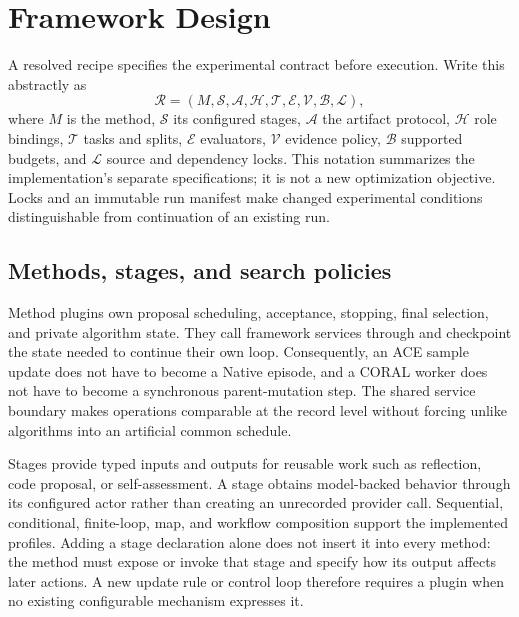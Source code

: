 \section{Framework Design}
\label{sec:framework}

A resolved recipe specifies the experimental contract before execution. Write this abstractly as
\begin{equation}
\mathcal{R}=(M,\mathcal{S},\mathcal{A},\mathcal{H},\mathcal{T},\mathcal{E},\mathcal{V},\mathcal{B},\mathcal{L}),
\end{equation}
where $M$ is the method, $\mathcal{S}$ its configured stages, $\mathcal{A}$ the artifact protocol, $\mathcal{H}$ role bindings, $\mathcal{T}$ tasks and splits, $\mathcal{E}$ evaluators, $\mathcal{V}$ evidence policy, $\mathcal{B}$ supported budgets, and $\mathcal{L}$ source and dependency locks. This notation summarizes the implementation's separate specifications; it is not a new optimization objective. Locks and an immutable run manifest make changed experimental conditions distinguishable from continuation of an existing run.

\subsection{Methods, stages, and search policies}
Method plugins own proposal scheduling, acceptance, stopping, final selection, and private algorithm state. They call framework services through  and checkpoint the state needed to continue their own loop. Consequently, an ACE sample update does not have to become a Native episode, and a CORAL worker does not have to become a synchronous parent-mutation step. The shared service boundary makes operations comparable at the record level without forcing unlike algorithms into an artificial common schedule.

Stages provide typed inputs and outputs for reusable work such as reflection, code proposal, or self-assessment. A stage obtains model-backed behavior through its configured actor rather than creating an unrecorded provider call. Sequential, conditional, finite-loop, map, and workflow composition support the implemented profiles. Adding a stage declaration alone does not insert it into every method: the method must expose or invoke that stage and specify how its output affects later actions. A new update rule or control loop therefore requires a plugin when no existing configurable mechanism expresses it.


